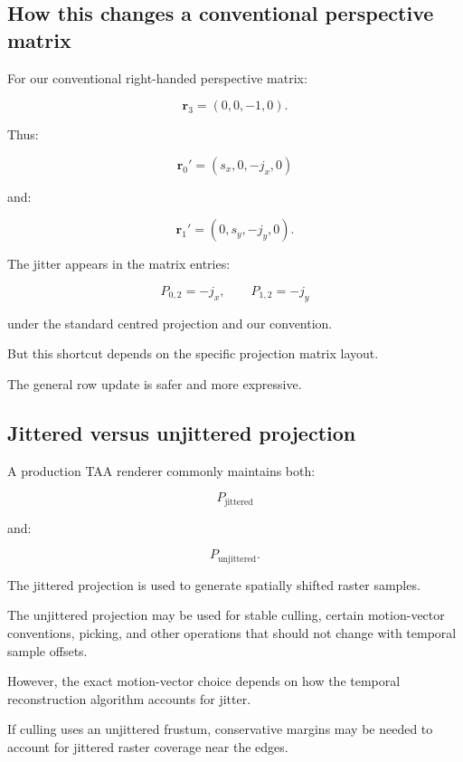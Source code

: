 \subsection{How this changes a conventional perspective matrix}\label{02-foundations-ii-ch036-how-this-changes-a-conventional-perspective-matrix}

\hypertarget{02-foundations-ii-ch036-how-this-changes-a-conventional-perspective-matrix}{}

For our conventional right-handed perspective matrix:

\[
 \mathbf r_3=(0,0,-1,0).
\]

Thus:

\[
 \mathbf r_0'= (s_x,0,-j_x,0)
\]

and:

\[
 \mathbf r_1'= (0,s_y,-j_y,0).
\]

The jitter appears in the matrix entries:

\[
 \boxed{ P_{0,2}=-j_x, \qquad P_{1,2}=-j_y }
\]

under the standard centred projection and our convention.

But this shortcut depends on the specific projection matrix layout.

The general row update is safer and more expressive.

\subsection{Jittered versus unjittered projection}\label{02-foundations-ii-ch036-jittered-versus-unjittered-projection}

\hypertarget{02-foundations-ii-ch036-jittered-versus-unjittered-projection}{}

A production TAA renderer commonly maintains both:

\[
 P_{\mathrm{jittered}}
\]

and:

\[
 P_{\mathrm{unjittered}}.
\]

The jittered projection is used to generate spatially shifted raster samples.

The unjittered projection may be used for stable culling, certain motion-vector conventions, picking, and other operations that should not change with temporal sample offsets.

However, the exact motion-vector choice depends on how the temporal reconstruction algorithm accounts for jitter.

If culling uses an unjittered frustum, conservative margins may be needed to account for jittered raster coverage near the edges.

